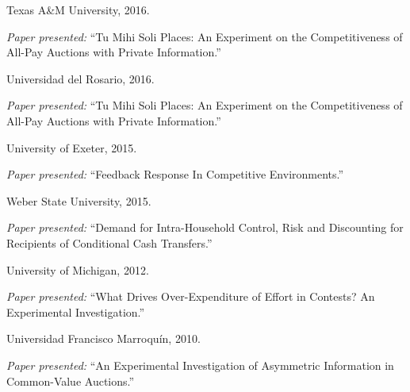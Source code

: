 \documentclass{article}%
\renewenvironment{itemize}{
\begin{list}{}{
\setlength{\leftmargin}{1.5em}
}
}{
\end{list}
}
\begin{document}
\begin{itemize}

\item Texas A\&M University, 2016.
\begin{itemize}\vspace{-.24cm}
\item \textit{Paper presented:} ``Tu Mihi Soli Places: An Experiment on the Competitiveness of All-Pay Auctions with Private Information.''
\end{itemize}

\item Universidad del Rosario, 2016.
\begin{itemize}\vspace{-.24cm}
\item \textit{Paper presented:} ``Tu Mihi Soli Places: An Experiment on the Competitiveness of All-Pay Auctions with Private Information.''
\end{itemize}

\item University of Exeter, 2015.
\begin{itemize}\vspace{-.24cm}
\item \textit{Paper presented:} ``Feedback Response In Competitive Environments.''
\end{itemize}

\item Weber State University, 2015.
\begin{itemize}\vspace{-.24cm}
\item \textit{Paper presented:} ``Demand for Intra-Household Control, Risk and Discounting for Recipients of Conditional Cash Transfers.''
\end{itemize}

\item University of Michigan, 2012.
\begin{itemize}\vspace{-.24cm}
\item \textit{Paper presented:}  ``What Drives Over-Expenditure of Effort in Contests? An Experimental Investigation.''
\end{itemize}

\item Universidad Francisco Marroqu\'{i}n, 2010.
\begin{itemize}\vspace{-.24cm}
\item \textit{Paper presented:} ``An Experimental Investigation of Asymmetric Information in Common-Value Auctions.''
\end{itemize}

\end{itemize}
\end{document}
